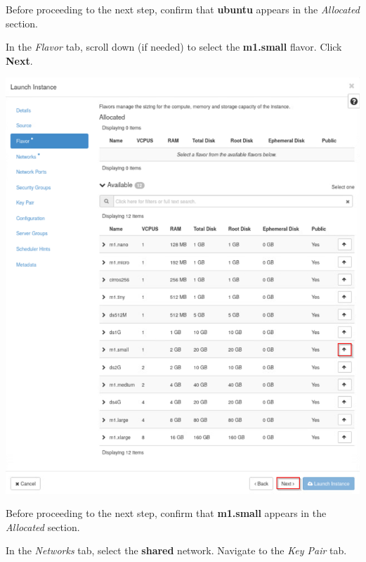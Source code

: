 \documentclass[letterpaper, 12pt]{article}
\begin{document}
\begin{enumerate}
    \begin{stopbox}
        Before proceeding to the next step, confirm that \textbf{ubuntu} appears in the \textit{Allocated} section.
    \end{stopbox}

    \begin{labstep}
        In the \textit{Flavor} tab, scroll down (if needed) to select the \textbf{m1.small} flavor.
        Click \textbf{Next}.

        \begin{center}
            \includegraphics[width=\linewidth]{images/part8/step9.png}
        \end{center}
    \end{labstep}

    \begin{stopbox}
        Before proceeding to the next step, confirm that \textbf{m1.small} appears in the \textit{Allocated} section.
    \end{stopbox}

    \begin{labstep}
        In the \textit{Networks} tab, select the \textbf{shared} network.
        Navigate to the \textit{Key Pair} tab.


\end{labstep}
\end{enumerate}
\end{document}
